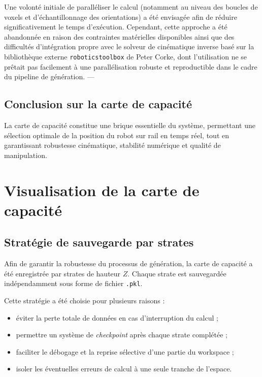\documentclass[11pt, a4paper]{article}
\begin{document}
Une volonté initiale de paralléliser le calcul (notamment au niveau des boucles de voxels et d’échantillonnage des orientations) a été envisagée afin de réduire significativement le temps d’exécution. Cependant, cette approche a été abandonnée en raison des contraintes matérielles disponibles ainsi que des difficultés d’intégration propre avec le solveur de cinématique inverse basé sur la bibliothèque externe \texttt{roboticstoolbox} de Peter Corke, dont l’utilisation ne se prêtait pas facilement à une parallélisation robuste et reproductible dans le cadre du pipeline de génération.
---

\subsection{Conclusion sur la carte de capacité}

La carte de capacité constitue une brique essentielle du système, permettant une sélection optimale de la position du robot sur rail en temps réel, tout en garantissant robustesse cinématique, stabilité numérique et qualité de manipulation.

\section{Visualisation de la carte de capacité}

\subsection{Stratégie de sauvegarde par strates}

Afin de garantir la robustesse du processus de génération, la carte de capacité a été enregistrée par strates de hauteur $Z$. Chaque strate est sauvegardée indépendamment sous forme de fichier \texttt{.pkl}.

Cette stratégie a été choisie pour plusieurs raisons :
\begin{itemize}
  \item éviter la perte totale de données en cas d’interruption du calcul ;
  \item permettre un système de \textit{checkpoint} après chaque strate complétée ;
  \item faciliter le débogage et la reprise sélective d’une partie du workspace ;
  \item isoler les éventuelles erreurs de calcul à une seule tranche de l’espace.
\end{itemize}
\end{document}
